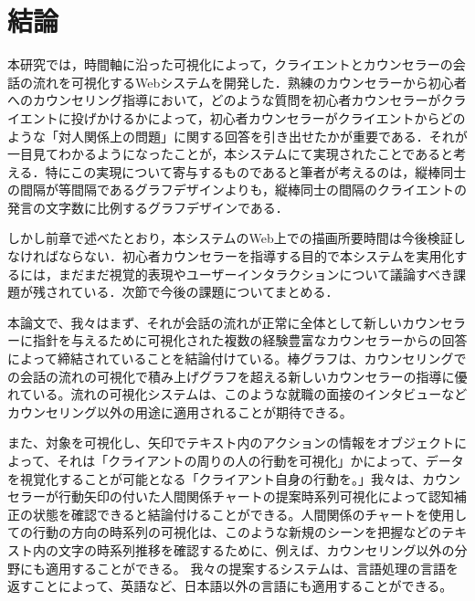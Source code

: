 \documentclass[shuuron]{kuee}
\begin{document}
\section{結論}

本研究では，時間軸に沿った可視化によって，クライエントとカウンセラーの会話の流れを可視化するWebシステムを開発した．熟練のカウンセラーから初心者へのカウンセリング指導において，どのような質問を初心者カウンセラーがクライエントに投げかけるかによって，初心者カウンセラーがクライエントからどのような「対人関係上の問題」に関する回答を引き出せたかが重要である．それが一目見てわかるようになったことが，本システムにて実現されたことであると考える．特にこの実現について寄与するものであると筆者が考えるのは，縦棒同士の間隔が等間隔であるグラフデザインよりも，縦棒同士の間隔のクライエントの発言の文字数に比例するグラフデザインである．

しかし前章で述べたとおり，本システムのWeb上での描画所要時間は今後検証しなければならない．初心者カウンセラーを指導する目的で本システムを実用化するには，まだまだ視覚的表現やユーザーインタラクションについて議論すべき課題が残されている．次節で今後の課題についてまとめる．



本論文で、我々はまず、それが会話の流れが正常に全体として新しいカウンセラーに指針を与えるために可視化された複数の経験豊富なカウンセラーからの回答によって締結されていることを結論付けている。棒グラフは、カウンセリングでの会話の流れの可視化で積み上げグラフを超える新しいカウンセラーの指導に優れている。流れの可視化システムは、このような就職の面接のインタビューなどカウンセリング以外の用途に適用されることが期待できる。

  また、対象を可視化し、矢印でテキスト内のアクションの情報をオブジェクトによって、それは「クライアントの周りの人の行動を可視化」かによって、データを視覚化することが可能となる「クライアント自身の行動を。」我々は、カウンセラーが行動矢印の付いた人間関係チャートの提案時系列可視化によって認知補正の状態を確認できると結論付けることができる。人間関係のチャートを使用しての行動の方向の時系列の可視化は、このような新規のシーンを把握などのテキスト内の文字の時系列推移を確認するために、例えば、カウンセリング以外の分野にも適用することができる。
    我々の提案するシステムは、言語処理の言語を返すことによって、英語など、日本語以外の言語にも適用することができる。
\end{document}

